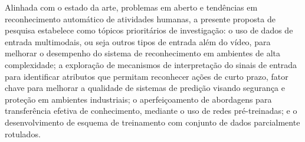 Alinhada com o estado da arte, problemas em aberto e tendências em reconhecimento automático de atividades humanas, a presente proposta de pesquisa estabelece como tópicos prioritários de investigação: o uso de dados de entrada  multimodais, ou seja outros tipos de entrada além do vídeo, para melhorar o desempenho do sistema de reconhecimento em ambientes de alta complexidade; a exploração de mecanismos de interpretação do sinais de entrada para identificar atributos que permitam reconhecer ações de curto prazo, fator chave para melhorar a qualidade de sistemas de predição visando segurança e proteção em ambientes industriais; o aperfeiçoamento de abordagens para transferência efetiva de conhecimento, mediante o uso de redes pré-treinadas; e o desenvolvimento de esquema de treinamento com conjunto de dados parcialmente rotulados.
